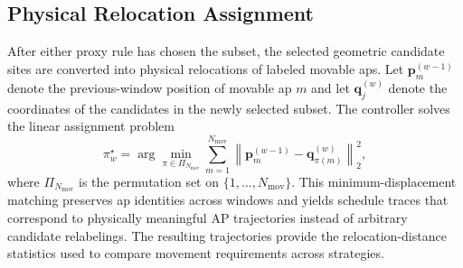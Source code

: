 \subsection{Physical Relocation Assignment}

After either proxy rule has chosen the subset, the selected geometric candidate sites are converted into physical relocations of labeled movable \glspl{ap}. Let $\mathbf{p}_m^{(w-1)}$ denote the previous-window position of movable \gls{ap} $m$ and let $\mathbf{q}_j^{(w)}$ denote the coordinates of the candidates in the newly selected subset. The controller solves the linear assignment problem
\begin{equation}
    \pi_w^\star =
    \arg\min_{\pi \in \Pi_{N_{\mathrm{mov}}}}
    \sum_{m=1}^{N_{\mathrm{mov}}}
    \left\|\mathbf{p}_m^{(w-1)}-\mathbf{q}_{\pi(m)}^{(w)}\right\|_2^2,
\end{equation}
where $\Pi_{N_{\mathrm{mov}}}$ is the permutation set on $\{1,\ldots,N_{\mathrm{mov}}\}$. This minimum-displacement matching preserves \gls{ap} identities across windows and yields schedule traces that correspond to physically meaningful AP trajectories instead of arbitrary candidate relabelings. The resulting trajectories provide the relocation-distance statistics used to compare movement requirements across strategies.

